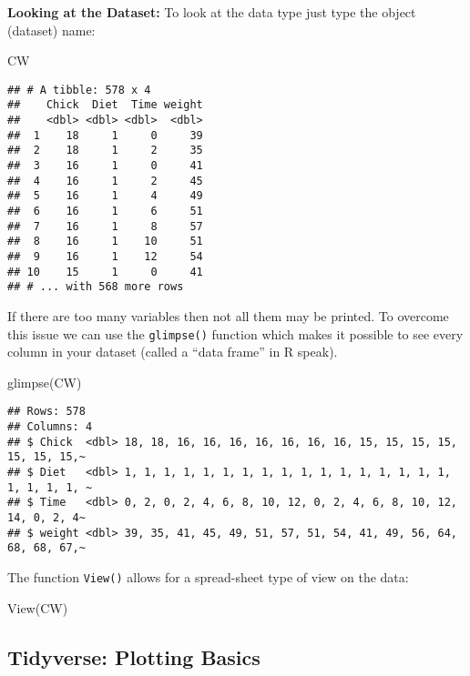 \documentclass[
]{book}
\newenvironment{Shaded}{\begin{snugshade}}{\end{snugshade}}
\newcommand{\FunctionTok}[1]{\textcolor[rgb]{0.00,0.00,0.00}{#1}}
\newcommand{\NormalTok}[1]{#1}
\begin{document}
\hfill\break

\textbf{Looking at the Dataset:}
To look at the data type just type the object (dataset) name:

\begin{Shaded}
\begin{Highlighting}[]
\NormalTok{CW}
\end{Highlighting}
\end{Shaded}

\begin{verbatim}
## # A tibble: 578 x 4
##    Chick  Diet  Time weight
##    <dbl> <dbl> <dbl>  <dbl>
##  1    18     1     0     39
##  2    18     1     2     35
##  3    16     1     0     41
##  4    16     1     2     45
##  5    16     1     4     49
##  6    16     1     6     51
##  7    16     1     8     57
##  8    16     1    10     51
##  9    16     1    12     54
## 10    15     1     0     41
## # ... with 568 more rows
\end{verbatim}

If there are too many variables then not all them may be printed. To overcome this issue
we can use the \texttt{glimpse()} function which makes it possible to see every column in your
dataset (called a ``data frame'' in R speak).

\begin{Shaded}
\begin{Highlighting}[]
\FunctionTok{glimpse}\NormalTok{(CW)}
\end{Highlighting}
\end{Shaded}

\begin{verbatim}
## Rows: 578
## Columns: 4
## $ Chick  <dbl> 18, 18, 16, 16, 16, 16, 16, 16, 16, 15, 15, 15, 15, 15, 15, 15,~
## $ Diet   <dbl> 1, 1, 1, 1, 1, 1, 1, 1, 1, 1, 1, 1, 1, 1, 1, 1, 1, 1, 1, 1, 1, ~
## $ Time   <dbl> 0, 2, 0, 2, 4, 6, 8, 10, 12, 0, 2, 4, 6, 8, 10, 12, 14, 0, 2, 4~
## $ weight <dbl> 39, 35, 41, 45, 49, 51, 57, 51, 54, 41, 49, 56, 64, 68, 68, 67,~
\end{verbatim}

The function \texttt{View()} allows for a spread-sheet type of view on the data:

\begin{Shaded}
\begin{Highlighting}[]
\FunctionTok{View}\NormalTok{(CW)}
\end{Highlighting}
\end{Shaded}

\hypertarget{tidyverse-plotting-basics}{%
\subsection{Tidyverse: Plotting Basics}\label{tidyverse-plotting-basics}}
\end{document}
